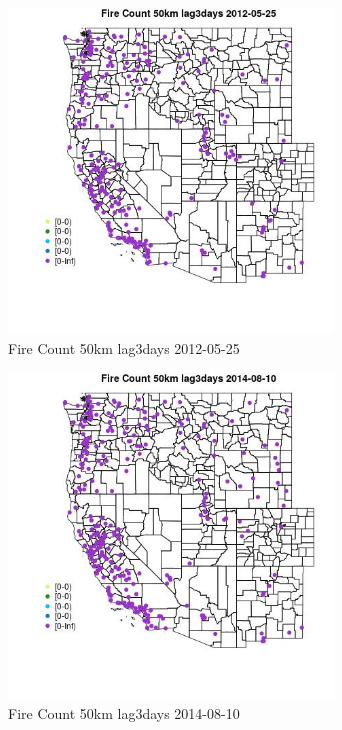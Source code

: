 \begin{figure} 
\centering  
\includegraphics[width=0.77\textwidth]{Code_Outputs/Report_ML_input_PM25_Step4_part_e_de_duplicated_aves_compiled_2019-05-18wNAs_MapObsFire_Count_50km_lag3days2012-05-25.jpg} 
\caption{\label{fig:Report_ML_input_PM25_Step4_part_e_de_duplicated_aves_compiled_2019-05-18wNAsMapObsFire_Count_50km_lag3days2012-05-25}Fire Count 50km lag3days 2012-05-25} 
\end{figure} 
 

\begin{figure} 
\centering  
\includegraphics[width=0.77\textwidth]{Code_Outputs/Report_ML_input_PM25_Step4_part_e_de_duplicated_aves_compiled_2019-05-18wNAs_MapObsFire_Count_50km_lag3days2014-08-10.jpg} 
\caption{\label{fig:Report_ML_input_PM25_Step4_part_e_de_duplicated_aves_compiled_2019-05-18wNAsMapObsFire_Count_50km_lag3days2014-08-10}Fire Count 50km lag3days 2014-08-10} 
\end{figure} 
 

